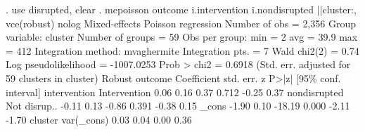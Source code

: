. use disrupted, clear
{\smallskip}
. mepoisson outcome i.intervention i.nondisrupted ||cluster:, vce(robust) nolog
{\smallskip}
Mixed-effects Poisson regression                Number of obs     =      2,356
Group variable: cluster                         Number of groups  =         59
{\smallskip}
                                                Obs per group:
                                                              min =          2
                                                              avg =       39.9
                                                              max =        412
{\smallskip}
Integration method: mvaghermite                 Integration pts.  =          7
{\smallskip}
                                                Wald chi2(2)      =       0.74
Log pseudolikelihood = -1007.0253               Prob > chi2       =     0.6918
                                (Std. err. adjusted for 59 clusters in cluster)
              {\VBAR}               Robust
      outcome {\VBAR} Coefficient  std. err.      z    P>|z|     [95\% conf. interval]
 intervention {\VBAR}
Intervention  {\VBAR}       0.06       0.16     0.37   0.712        -0.25        0.37
              {\VBAR}
 nondisrupted {\VBAR}
Not disrup..  {\VBAR}      -0.11       0.13    -0.86   0.391        -0.38        0.15
        _cons {\VBAR}      -1.90       0.10   -18.19   0.000        -2.11       -1.70
cluster       {\VBAR}
    var(_cons){\VBAR}       0.03       0.04                          0.00        0.36
